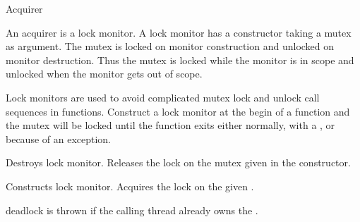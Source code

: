 
\begin{classpage}{Acquirer}

An acquirer is a lock monitor. A lock monitor has a
constructor taking a mutex as argument. The mutex is locked on monitor
construction and unlocked on monitor destruction. Thus the mutex is
locked while the monitor is in scope and unlocked when the monitor
gets out of scope.

Lock monitors are used to avoid complicated mutex lock and unlock call
sequences in functions. Construct a lock monitor at the begin of a
function and the mutex will be locked until the function exits either
normally, with a , or because of an exception.


\begin{mandescription}
  \destructor
  Destroys  lock monitor. Releases the lock on the mutex
  given in the constructor.

  Constructs  lock monitor. Acquires the lock on the given
  .
  \begin{exception}
    \item[deadlock] is thrown if the calling thread already owns the .
  \end{exception}
\end{mandescription}

\end{classpage}
